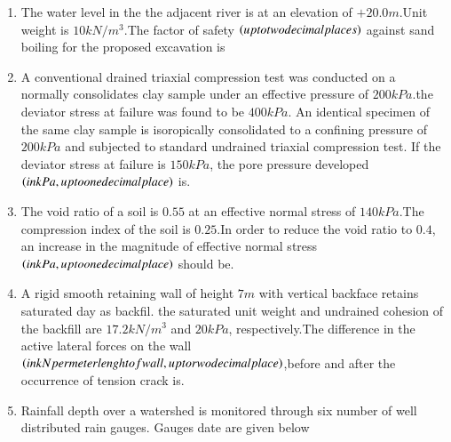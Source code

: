 \documentclass[journal,12pt,twocolumn]{IEEEtran}
\theoremstyle{remark}
\begin{document}
\begin{enumerate}
 \item The water level in the the adjacent river is at an elevation of $+20.0 m$.Unit weight is $10 kN/m^{3}$.The factor of safety $\left(up to two decimal places\right)$ against sand boiling for the proposed excavation is \\
\item A conventional drained triaxial compression test was conducted  on a normally consolidates clay sample under an effective pressure of $200 kPa$.the deviator stress at failure was found to be $400 kPa$. An identical specimen of the same clay sample is isoropically consolidated to a confining pressure of $200 kPa$ and subjected to standard undrained triaxial compression test. If the deviator stress at failure is $150 kPa$, the pore pressure developed $\left(in kPa, up to one decimal place\right) $ is.\\
\item The void ratio of a soil is $0.55$ at an effective normal stress of $140 kPa$.The compression index of the soil is $0.25$.In order to reduce the void ratio to $0.4$, an increase in the magnitude of effective normal stress $\left(in kPa,up to one decimal place\right)$ should be.\\
\item A rigid smooth retaining wall of height $7 m$ with vertical backface retains saturated day as backfil. the saturated unit weight and undrained cohesion of the backfill are $17.2 kN/m^{3}$ and $20 kPa$, respectively.The difference in the active lateral forces on the wall $\left(in kN per meter lenght of wall,up to rwo decimal place\right)$,before and after the occurrence of tension crack is.\\
\item Rainfall depth over a watershed is monitored through six number of well distributed rain gauges. Gauges date are given below\\


\end{enumerate}
\end{document}
